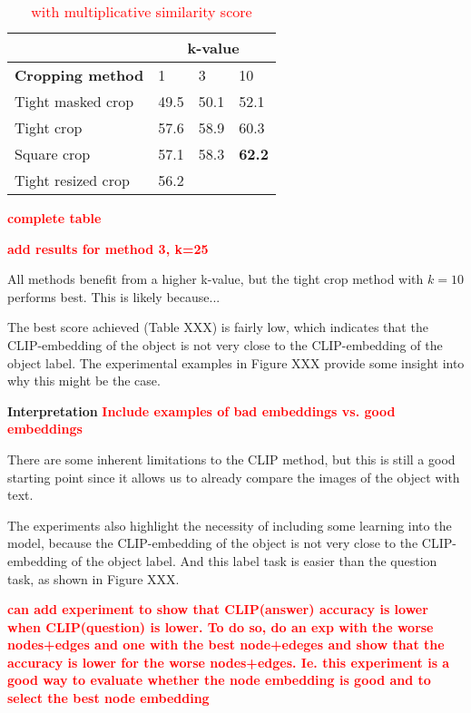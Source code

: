 \begin{table}[htbp]
    \centering
    \caption{\textcolor{red}{with multiplicative similarity score}}
    \begin{tabular}{l|lll|}
    \cline{2-4}
                                                   & \multicolumn{3}{c|}{\textbf{k-value}} \\ \hline
    \multicolumn{1}{|c|}{\textbf{Cropping method}} & 1        & 3       & 10               \\ \hline
    \multicolumn{1}{|l|}{Tight masked crop}        & 49.5     & 50.1    & 52.1             \\
    \multicolumn{1}{|l|}{Tight crop}               & 57.6     & 58.9    & 60.3             \\
    \multicolumn{1}{|l|}{Square crop}              & 57.1     & 58.3    & \textbf{62.2}    \\
    \multicolumn{1}{|l|}{Tight resized crop}       & 56.2     &         &                  \\ \hline
    \end{tabular}
\end{table}

\textcolor{red}{\textbf{complete table}}

\textcolor{red}{\textbf{add results for method 3, k=25}}


All methods benefit from a higher k-value, but the tight crop method with $k=10$ performs best. This is likely because...

The best score achieved (Table XXX) is fairly low, which indicates that the CLIP-embedding of the object is not very close to the CLIP-embedding of the object label. The experimental examples in Figure XXX provide some insight into why this might be the case.

\bigskip
\noindent
\textbf{Interpretation}
\textcolor{red}{\textbf{Include examples of bad embeddings vs. good embeddings}}

There are some inherent limitations to the CLIP method, but this is still a good starting point since it allows us to already compare the images of the object with text.

The experiments also highlight the necessity of including some learning into the model, because the CLIP-embedding of the object is not very close to the CLIP-embedding of the object label. And this label task is easier than the question task, as shown in Figure XXX.

\textcolor{red}{\textbf{can add experiment to show that CLIP(answer) accuracy is lower when CLIP(question) is lower.
To do so, do an exp with the worse nodes+edges and one with the best node+edeges and show that the accuracy is lower for the worse nodes+edges.
Ie. this experiment is a good way to evaluate whether the node embedding is good and to select the best node embedding}}

